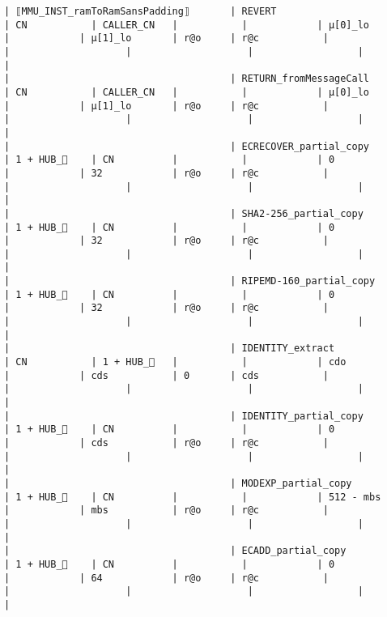 \documentclass[varwidth=\maxdimen,margin=0.5cm,multi={verbatim}]{standalone}
\begin{document}
\begin{verbatim}
| ⟦MMU_INST_ramToRamSansPadding⟧       | REVERT                           | CN           | CALLER_CN   |           |            | µ[0]_lo           |            | µ[1]_lo       | r@o     | r@c           |                        |                    |                    |                  |                            |
|                                      | RETURN_fromMessageCall           | CN           | CALLER_CN   |           |            | µ[0]_lo           |            | µ[1]_lo       | r@o     | r@c           |                        |                    |                    |                  |                            |
|                                      | ECRECOVER_partial_copy           | 1 + HUB_    | CN          |           |            | 0                 |            | 32            | r@o     | r@c           |                        |                    |                    |                  |                            |
|                                      | SHA2-256_partial_copy            | 1 + HUB_    | CN          |           |            | 0                 |            | 32            | r@o     | r@c           |                        |                    |                    |                  |                            |
|                                      | RIPEMD-160_partial_copy          | 1 + HUB_    | CN          |           |            | 0                 |            | 32            | r@o     | r@c           |                        |                    |                    |                  |                            |
|                                      | IDENTITY_extract                 | CN           | 1 + HUB_   |           |            | cdo               |            | cds           | 0       | cds           |                        |                    |                    |                  |                            |
|                                      | IDENTITY_partial_copy            | 1 + HUB_    | CN          |           |            | 0                 |            | cds           | r@o     | r@c           |                        |                    |                    |                  |                            |
|                                      | MODEXP_partial_copy              | 1 + HUB_    | CN          |           |            | 512 - mbs         |            | mbs           | r@o     | r@c           |                        |                    |                    |                  |                            |
|                                      | ECADD_partial_copy               | 1 + HUB_    | CN          |           |            | 0                 |            | 64            | r@o     | r@c           |                        |                    |                    |                  |                            |

\end{verbatim}
\end{document}
